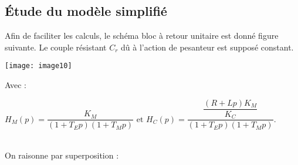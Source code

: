 \begin{multicols}{2}
%
%
%
%
%

\subsection*{Étude du modèle simplifié}
\ifprof
\else
Afin de faciliter les calculs, le schéma bloc à retour unitaire est donné figure suivante. Le couple résistant $C_r$ dû à l'action de pesanteur est supposé constant.
 
 \begin{center}
\texttt{[image: image10]}
\end{center} 


Avec : 

\noindent $H_M (p)=\dfrac{K_M}{(1+T_E p)(1+T_M p)} \text{ et }
H_C (p)=\dfrac{\dfrac{\left(R+Lp\right)K_M}{K_C}}{(1+T_E p)(1+T_M p)}$.
\fi

\ifprof
\begin{corrige}~\\
On raisonne par superposition :


\end{corrige}
\end{multicols}
